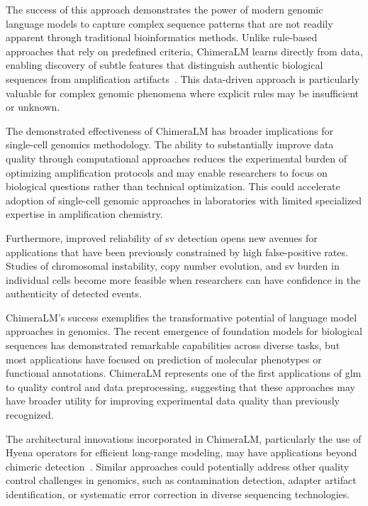 \documentclass[pdflatex,sn-nature]{sn-jnl}%
\theoremstyle{thmstyleone}%
\theoremstyle{thmstyletwo}%
\theoremstyle{thmstylethree}%
\begin{document}
The success of this approach demonstrates the power of modern genomic language models to capture complex sequence patterns that are not readily apparent through traditional bioinformatics methods.
Unlike rule-based approaches that rely on predefined criteria, ChimeraLM learns directly from data, enabling discovery of subtle features that distinguish authentic biological sequences from amplification artifacts~\cite{lu2023exploration, agyabeng2025evaluating, nguyen2023hyenadna}.
This data-driven approach is particularly valuable for complex genomic phenomena where explicit rules may be insufficient or unknown.

The demonstrated effectiveness of ChimeraLM has broader implications for single-cell genomics methodology.
The ability to substantially improve data quality through computational approaches reduces the experimental burden of optimizing amplification protocols and may enable researchers to focus on biological questions rather than technical optimization.
This could accelerate adoption of single-cell genomic approaches in laboratories with limited specialized expertise in amplification chemistry.

Furthermore, improved reliability of \gls{sv} detection opens new avenues for applications that have been previously constrained by high false-positive rates.
Studies of chromosomal instability, copy number evolution, and \gls{sv} burden in individual cells become more feasible when researchers can have confidence in the authenticity of detected events.

ChimeraLM's success exemplifies the transformative potential of language model approaches in genomics.
The recent emergence of foundation models for biological sequences has demonstrated remarkable capabilities across diverse tasks, but most applications have focused on prediction of molecular phenotypes or functional annotations.
ChimeraLM represents one of the first applications of \gls{glm} to quality control and data preprocessing, suggesting that these approaches may have broader utility for improving experimental data quality than previously recognized.

The architectural innovations incorporated in ChimeraLM, particularly the use of Hyena operators for efficient long-range modeling, may have applications beyond chimeric detection~\cite{Poli2023HyenaHT, nguyen2023hyenadna}.
Similar approaches could potentially address other quality control challenges in genomics, such as contamination detection, adapter artifact identification, or systematic error correction in diverse sequencing technologies.
\end{document}
